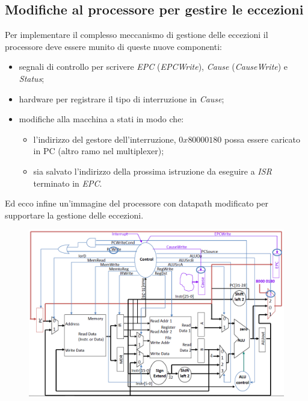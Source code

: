 \documentclass[class=book, crop=false, oneside]{standalone}
\begin{document}
\subsection{Modifiche al processore per gestire le eccezioni}
Per implementare il complesso meccanismo di gestione delle eccezioni il processore deve essere munito di queste nuove componenti:
\begin{itemize}
	\item segnali di controllo per scrivere \emph{EPC} (\emph{EPCWrite}), \emph{Cause} (\emph{CauseWrite}) e \emph{Status};
	\item hardware per registrare il tipo di interruzione in \emph{Cause};
	\item modifiche alla macchina a stati in modo che:
	\begin{itemize}
		\item l'indirizzo del gestore dell'interruzione, \(0x80000180\) possa essere caricato in PC (altro ramo nel multiplexer);
		\item sia salvato l'indirizzo della prossima istruzione da eseguire a \emph{ISR} terminato in \emph{EPC}.
	\end{itemize}
\end{itemize}
Ed ecco infine un'immagine del processore con datapath modificato per supportare la gestione delle eccezioni.
\begin{figure}[!h]
	\centering
	\includegraphics[width=\textwidth,keepaspectratio]{final-datapath}
\end{figure}
\end{document}
